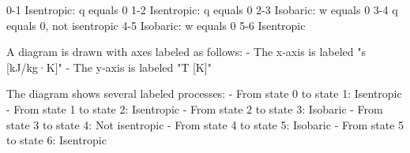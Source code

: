 0-1 Isentropic: q equals 0  
1-2 Isentropic: q equals 0  
2-3 Isobaric: w equals 0  
3-4 q equals 0, not isentropic  
4-5 Isobaric: w equals 0  
5-6 Isentropic  

A diagram is drawn with axes labeled as follows:  
- The x-axis is labeled "s [kJ/kg·K]"  
- The y-axis is labeled "T [K]"  

The diagram shows several labeled processes:  
- From state 0 to state 1: Isentropic  
- From state 1 to state 2: Isentropic  
- From state 2 to state 3: Isobaric  
- From state 3 to state 4: Not isentropic  
- From state 4 to state 5: Isobaric  
- From state 5 to state 6: Isentropic